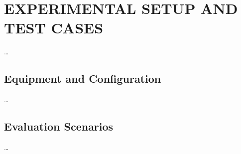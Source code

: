 
\section{EXPERIMENTAL SETUP AND TEST CASES}


    \ldots

    \subsection{Equipment and Configuration}

        \ldots

    \subsection{Evaluation Scenarios}

        \ldots
        